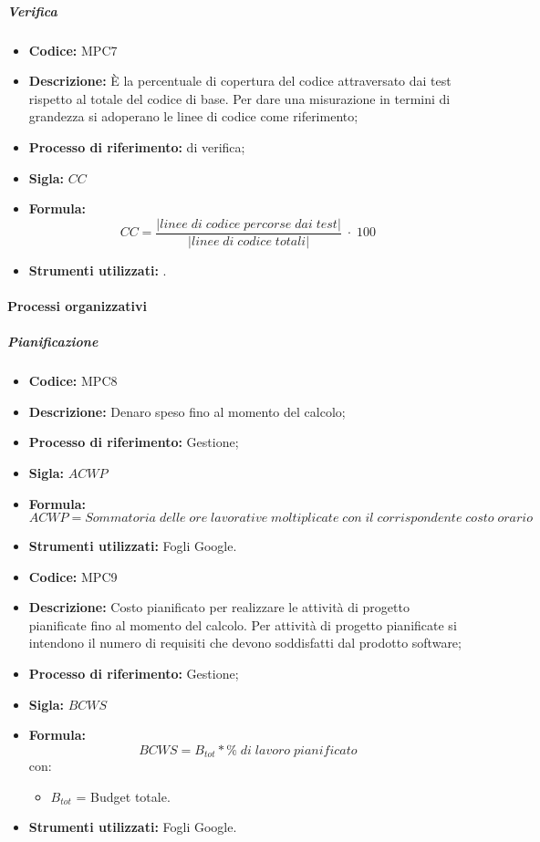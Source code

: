 \subparagraph{Verifica}
\begin{itemize}
	\item \textbf{Codice:} MPC7
	\item \textbf{Descrizione:} È la percentuale di copertura del codice attraversato dai test rispetto al totale del codice di base. Per dare una misurazione in termini di grandezza si adoperano le linee di codice come riferimento;
	\item \textbf{Processo di riferimento:}  di verifica;
	\item \textbf{Sigla:} $CC$
	\item \textbf{Formula:} $$CC = \frac{|linee \; di \; codice \; percorse \; dai  \; test|}{|linee \; di \; codice \; totali|} \; \cdot \; 100$$
	\item \textbf{Strumenti utilizzati:} .
\end{itemize}
   \paragraph{Processi organizzativi}

\subparagraph{Pianificazione}

    \begin{itemize}
        \item \textbf{Codice:} MPC8
        \item \textbf{Descrizione:} Denaro speso fino al momento del calcolo;
        \item \textbf{Processo di riferimento:} Gestione;
        \item \textbf{Sigla:} $ACWP$
        \item \textbf{Formula:} $$ACWP = {Sommatoria\; delle\; ore\; lavorative\; moltiplicate\; con\; il\; corrispondente\; costo\; orario}$$
        \item \textbf{Strumenti utilizzati:} Fogli Google.
    \end{itemize}

\begin{itemize}
	\item \textbf{Codice:} MPC9
    \item \textbf{Descrizione:} Costo pianificato per realizzare le attività di progetto pianificate fino al momento del calcolo.
    Per attività di progetto pianificate si intendono il numero di requisiti che devono soddisfatti dal prodotto software;
	\item \textbf{Processo di riferimento:} Gestione;
	\item \textbf{Sigla:} $BCWS$
	\item \textbf{Formula:} $$BCWS = {B_{tot} * \% \;di\; lavoro\; pianificato}$$
	con:
	\begin{itemize}
		\item $B_{tot}$ = Budget totale.
	\end{itemize}
	\item \textbf{Strumenti utilizzati:} Fogli Google.
\end{itemize}

